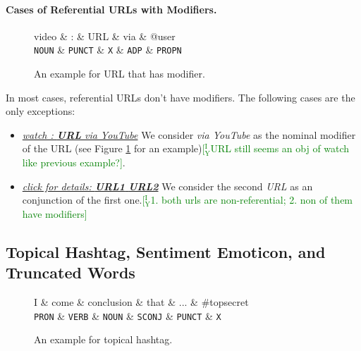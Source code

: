\documentclass[11pt,a4paper]{article}
\newcommand{\yicomment}[1]{\textcolor{green}{[$_\mathrm{Y}^\mathrm{I}$#1]}}
\begin{document}
\paragraph{Cases of Referential URLs with Modifiers.}
\begin{figure}[t]
	\centering
	\small
	\begin{dependency}[edge slant=2, text only label, label style=above]
		\begin{deptext}
			video \& : \& URL \& via \& @user \\
			\texttt{NOUN} \& \texttt{PUNCT} \& \texttt{X} \& \texttt{ADP} \& \texttt{PROPN} \\
		\end{deptext}
		\depedge{1}{3}{list\yicomment{not appos??}}
	\end{dependency}
	\caption{An example for URL that has modifier.}\label{fig:ref-w-mod}
\end{figure}
In most cases, referential URLs don't have modifiers.
The following cases are the only exceptions:
\begin{itemize}
	\item \underline{\textit{watch : \textbf{URL} via YouTube}}
	We consider \textit{via YouTube} as the nominal modifier of the URL
	(see Figure \ref{fig:ref-w-mod} for an example)\yicomment{URL still seems an obj of watch like previous example?}.
	\item \underline{\textit{click for details: \textbf{URL1} \textbf{URL2}}}
	We consider the second \textit{URL} as an conjunction of the first one.\yicomment{1. both urls are non-referential; 2. non of them have modifiers}
\end{itemize}

\subsection{Topical Hashtag, Sentiment Emoticon, and Truncated Words}

\begin{figure}[t]
	\centering
	\small
	\begin{dependency}[edge slant=2, text only label, label style=above]
		\begin{deptext}
			I \& come \& conclusion \& that \& ... \& \#topsecret \\
			\texttt{PRON} \& \texttt{VERB} \& \texttt{NOUN} \& \texttt{SCONJ} \& \texttt{PUNCT} \& \texttt{X}\\
		\end{deptext}
	\end{dependency}
	\caption{An example for topical hashtag.}\label{fig:hashtag}
\end{figure}
\end{document}
